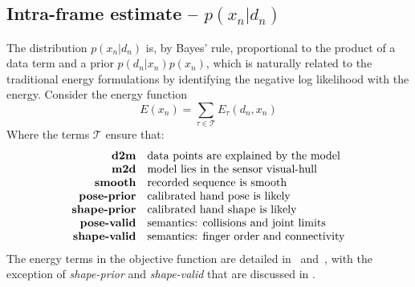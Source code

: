 


\subsection{Intra-frame estimate -- $p(x_n|d_n)$}
\label{sec:independent}
\label{sec:intra}
The distribution $p(x_n|d_n)$ is, by Bayes' rule, proportional to the product of a data term and a prior $p(d_n|x_n)p(x_n)$, which is naturally related to the traditional energy formulations by identifying the negative log likelihood with the energy.  Consider the energy function
% 
\begin{equation}
E(x_n) = \sum_{\tau \in \mathcal{T}} E_{\tau}(d_n, x_n) 
\label{eq:energies}
\end{equation}
% 
Where the terms $\mathcal{T}$ ensure that:
%
\begin{equation*}
\setlength{\jot}{0pt}
\begin{aligned}
\text{\textbf{d2m}} & \quad \text{data points are explained by the model} \\ 
\text{\textbf{m2d}} & \quad \text{model lies in the sensor visual-hull} \\
\text{\textbf{smooth}} & \quad \text{recorded sequence is smooth} \\
\text{\textbf{pose-prior}} & \quad \text{calibrated hand pose is likely} \\
\text{\textbf{shape-prior}} & \quad \text{calibrated hand shape is likely} \\
\text{\textbf{pose-valid}} & \quad \text{semantics: collisions and joint limits} \\
\text{\textbf{shape-valid}} & \quad \text{semantics: finger order and connectivity}
\end{aligned}
\end{equation*}
The energy terms in the objective function are detailed in~\cite{tkach2016sphere} and~\cite{htrack}, with the exception of \emph{shape-prior} and \emph{shape-valid} that are discussed in .

